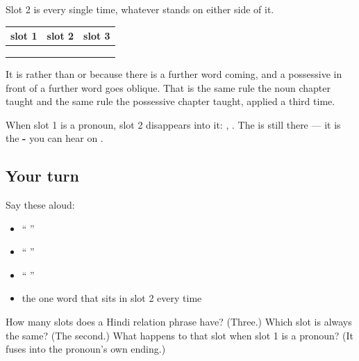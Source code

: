 \begin{grammarlens}[title={Grammar Lens: the one word that never changes}]
Slot 2 is \textbf{} every single time, whatever stands on either side of it.

\noindent
\begin{tabularx}{\linewidth}{@{}>{\raggedright\arraybackslash}X>{\raggedright\arraybackslash}X>{\raggedright\arraybackslash}X@{}}
\toprule
\textbf{slot 1} & \textbf{slot 2} & \textbf{slot 3} \\
\midrule
\hi{दोस्त} & \hi{के} & \hi{साथ} \\
\hi{घर} & \hi{के} & \hi{पास} \\
\hi{करने} & \hi{के} & \hi{लिए} \\
\bottomrule
\end{tabularx}

It is \textbf{} rather than \textbf{} or \textbf{} because there is a further word coming, and a possessive in front of a further word goes oblique. That is the same rule the noun chapter taught and the same rule the possessive chapter taught, applied a third time.

When slot 1 is a pronoun, slot 2 disappears into it: \textbf{ }, \textbf{ }. The \textbf{} is still there — it is the \textbf{-} you can hear on \textbf{}.
\end{grammarlens}

\subsection*{Your turn}
Say these aloud:

\begin{itemize}
\raggedright
  \item \textquotedblleft{}  \textquotedblright{}
  \item \textquotedblleft{}  \textquotedblright{}
  \item \textquotedblleft{}   \textquotedblright{}
  \item the one word that sits in slot 2 every time
\end{itemize}

\begin{tcolorbox}[breakable,colback=teal!4,colframe=teal!35!black,title={Before you move on}]
How many slots does a Hindi relation phrase have? (Three.) Which slot is always the same? (The second.) What happens to that slot when slot 1 is a pronoun? (It fuses into the pronoun's own ending.)
\end{tcolorbox}
